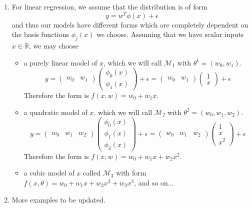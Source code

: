 \documentclass{article}
\begin{document}
    \begin{enumerate}
      \item For linear regression, we assume that the distribution is of form
      \begin{equation}
        y = w^T \phi(x) + \epsilon
      \end{equation}
      and thus our models have different forms which are completely dependent on the basis functions $\phi_j(x)$ we choose. Assuming that we have scalar inputs $x \in \mathbb{R}$, we may choose
      \begin{itemize}
        \item a purely linear model of $x$, which we will call $\mathcal{M}_1$ with $\theta^1 = (w_0, w_1)$.
        \begin{equation}
          y = \begin{pmatrix} w_0 & w_1 \end{pmatrix} \begin{pmatrix} \phi_0 (x) \\ \phi_1 (x) \end{pmatrix} + \epsilon = \begin{pmatrix} w_0 & w_1 \end{pmatrix} \begin{pmatrix} 1 \\ x \end{pmatrix} + \epsilon
        \end{equation}
        Therefore the form is $f(x, w) = w_0 + w_1 x$.

        \item a quadratic model of $x$, which we will call $\mathcal{M}_2$ with $\theta^2 = (w_0, w_1, w_2)$.
        \begin{equation}
          y = \begin{pmatrix} w_0 & w_1 & w_2 \end{pmatrix} \begin{pmatrix} \phi_0 (x) \\ \phi_1 (x) \\ \phi_2 (x) \end{pmatrix} + \epsilon = \begin{pmatrix} w_0 & w_1 & w_2 \end{pmatrix} \begin{pmatrix} 1 \\ x \\ x^2 \end{pmatrix} + \epsilon
        \end{equation}
        Therefore the form is $f(x, w) = w_0 + w_1 x + w_2 x^2$.

        \item a cubic model of $x$ called $\mathcal{M}_3$ with form $f(x, \theta) = w_0 + w_1 x + w_2 x^2 + w_3 x^3$, and so on...
      \end{itemize}
      \item More examples to be updated.
    \end{enumerate}
\end{document}
